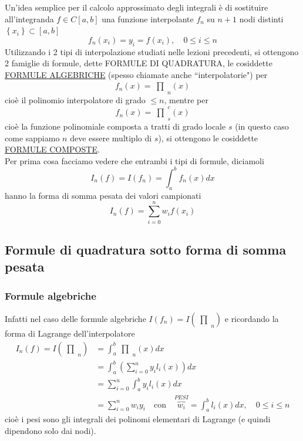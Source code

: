 \documentclass[12pt,a4paper]{article}
\newcommand{\inter}{\begin{matrix}\prod\end{matrix}}
\begin{document}
Un'idea semplice per il calcolo approssimato degli integrali è di sostituire all'integranda $f \in C[a,b]$ una funzione interpolante $f_n$ su $n+1$ nodi distinti $\left\{x_i\right\} \subset [a,b]$
\begin{equation*}
    f_n(x_i) = y_i = f(x_i), \quad 0 \leq i \leq n
\end{equation*}
Utilizzando i 2 tipi di interpolazione studiati nelle lezioni precedenti, si ottengono 2 famiglie di formule, dette FORMULE DI QUADRATURA, le cosiddette \uline{FORMULE ALGEBRICHE} (spesso chiamate anche ``interpolatorie") per
\begin{equation*}
    f_n(x) = \inter_n(x)
\end{equation*}
cioè il polinomio interpolatore di grado $\leq n$, mentre per 
\begin{equation*}
    f_n(x) = \inter_s^c(x)
\end{equation*}
cioè la funzione polinomiale composta a tratti di grado locale $s$ (in questo caso come sappiamo $n$ deve essere multiplo di $s$), si ottengono le cosiddette \uline{FORMULE COMPOSTE}. \\
Per prima cosa facciamo vedere che entrambi i tipi di formule, diciamoli
\begin{equation*}
    I_n(f) = I(f_n) = \int_a^b f_n(x) dx
\end{equation*}
hanno la forma di somma pesata dei valori campionati
\begin{equation*}
    I_n(f) = \sum_{i=0}^n w_i f(x_i)
\end{equation*}

\subsection{Formule di quadratura sotto forma di somma pesata}
\subsubsection{Formule algebriche}
Infatti nel caso delle formule algebriche $I(f_n)=I(\inter_n)$ e ricordando la forma di Lagrange dell'interpolatore
\begin{equation*}
    \begin{split}
        I_n(f) = I(\inter_n) & = \int_a^b \inter_n(x) dx \\
        & = \int_a^b \left(\sum_{i=0}^n y_i l_i(x)\right) dx \\
        & = \sum_{i=0}^n \int_a^b y_i l_i(x) dx \\
        & = \sum_{i=0}^n w_i y_i \quad \text{con} \quad \overbrace{w_i}^{PESI} = \int_a^b l_i(x) dx, \quad 0 \leq i \leq n
    \end{split}
\end{equation*}
cioè i pesi sono gli integrali dei polinomi elementari di Lagrange (e quindi dipendono solo dai nodi).
\end{document}
